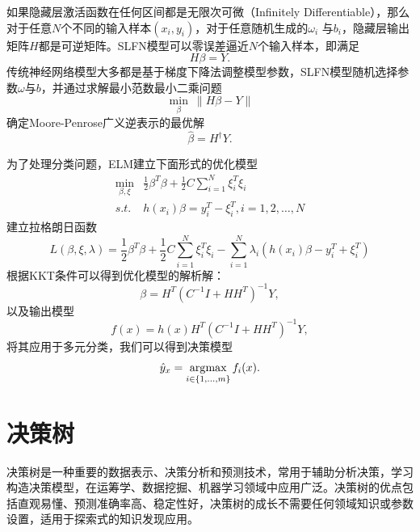 如果隐藏层激活函数在任何区间都是无限次可微（Infinitely Differentiable），那么对于任意$N$个不同的输入样本$(x_i,y_i)$，对于任意随机生成的$\omega_i$ 与$b_i$，隐藏层输出矩阵$H$都是可逆矩阵\cite{huang2006extreme}。SLFN模型可以零误差逼近$N$个输入样本，即满足
\begin{equation}
    H\beta = Y.
\end{equation}
传统神经网络模型大多都是基于梯度下降法调整模型参数，SLFN模型随机选择参数$\omega$与$b$，并通过求解最小范数最小二乘问题
\begin{equation}
    \min\limits_{\beta}~\|H\beta - Y\|
\end{equation}
确定Moore-Penrose广义逆表示的最优解
\begin{equation}
    \hat \beta = H^{\dag} Y.
\end{equation}

为了处理分类问题，ELM建立下面形式的优化模型
\begin{equation}
    \begin{array}{ll}
    \min\limits_{\beta,\xi} & \frac{1}{2} \beta^T \beta + \frac{1}{2} C \sum\limits_{i=1}^N \xi_i^T \xi_i\\
    \textit{s.t.} & h(x_i) \beta = y_i^T - \xi_i^T,i = 1,2,\ldots,N
    \end{array}
\end{equation}
建立拉格朗日函数
\begin{equation}
    L(\beta, \xi, \lambda) = \frac{1}{2} \beta^T \beta + \frac{1}{2} C \sum\limits_{i=1}^N \xi_i^T \xi_i - \sum\limits_{i=1}^N \lambda_i (h(x_i) \beta - y_i^T + \xi_i^T)
\end{equation}
根据KKT条件可以得到优化模型的解析解：
\begin{equation}
    \beta = H^T (C^{-1} I + HH^T)^{-1} Y,
\end{equation}
以及输出模型
\begin{equation}
    f(x) = h(x) H^T (C^{-1} I + HH^T)^{-1} Y,
\end{equation}
将其应用于多元分类，我们可以得到决策模型
\begin{equation}
    \hat y_x = \operatorname*{\mathrm{\arg\!\max}}\limits_{i\in\{1,\ldots,m\}} f_i(x).
\end{equation}

\chapter{决策树}
决策树是一种重要的数据表示、决策分析和预测技术，常用于辅助分析决策，学习构造决策模型，在运筹学、数据挖掘、机器学习领域中应用广泛。决策树的优点包括直观易懂、预测准确率高、稳定性好，决策树的成长不需要任何领域知识或参数设置，适用于探索式的知识发现应用。

